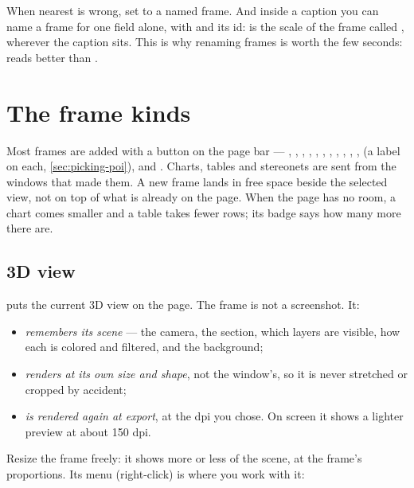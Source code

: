 When nearest is wrong, set  to a named frame. And inside a caption you can name a frame for one field alone, with  and its id:  is the scale of the frame called , wherever the caption sits. This is why renaming frames is worth the few seconds:  reads better than .

\section{The frame kinds}\label{sec:compo-kinds}

Most frames are added with a button on the page bar — , , , , , , , , , , ,  (a label on each, \cref{sec:picking-poi}),  and . Charts, tables and stereonets are sent from the windows that made them. A new frame lands in free space beside the selected view, not on top of what is already on the page. When the page has no room, a chart comes smaller and a table takes fewer rows; its badge says how many more there are.

\subsection{3D view}\label{sec:compo-view}

 puts the current 3D view on the page. The frame is not a screenshot. It:

\begin{itemize}
\item \emph{remembers its scene} — the camera, the section, which layers are visible, how each is colored and filtered, and the background;
\item \emph{renders at its own size and shape}, not the window's, so it is never stretched or cropped by accident;
\item \emph{is rendered again at export}, at the dpi you chose. On screen it shows a lighter preview at about 150 dpi.
\end{itemize}

Resize the frame freely: it shows more or less of the scene, at the frame's proportions. Its menu (right-click) is where you work with it:

